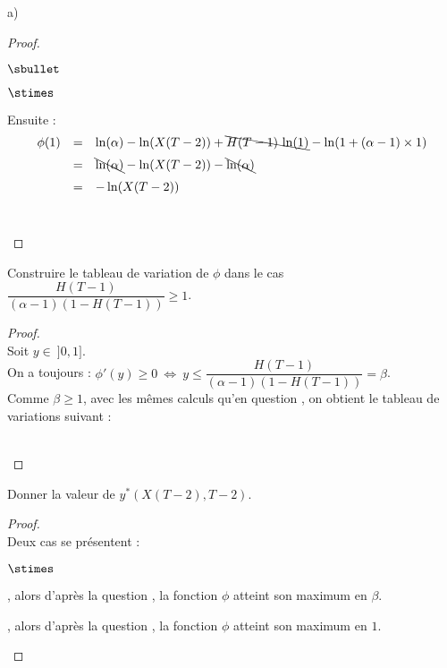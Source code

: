 \documentclass[11pt]{article}%
\begin{document}
\begin{noliste}{a)}
\begin{proof}
\begin{noliste}{$\sbullet$}
\begin{noliste}{$\stimes$}
	  \item Ensuite :
	  \[
	    \begin{array}{rcl}
	      \phi(1) &=& \ln(\alpha) - \ln(X(T-2)) + 
	      \bcancel{H(T-1) \, \ln(1)} - \ln(1+ (\alpha-1) \times 1)
	      \\[.2cm]
	      &=& \bcancel{\ln(\alpha)} - \ln(X(T-2)) - 
	      \bcancel{\ln(\alpha)}
	      \\[.2cm]
	      &=& - \ln(X(T-2))
	    \end{array}
	  \]~\\[-1.8cm]
	\end{noliste}
      \end{noliste}
    \end{proof}
    
    \item Construire le tableau de variation de $\phi$ dans le cas 
    $\dfrac{H(T-1)}{(\alpha-1)(1-H(T-1))} \geq 1$.
    
    \begin{proof}~\\
      Soit $y \in \ ]0,1]$.\\
      On a toujours : $\phi'(y) \geq 0 \ \Leftrightarrow \
      y \leq \dfrac{H(T-1)}{(\alpha -1) (1- H(T-1))} = \beta$.\\[.1cm]
      Comme $\beta \geq 1$, avec les mêmes calculs qu'en 
      question , on obtient le tableau de variations 
      suivant :
      \begin{center}
      \end{center}~\\[-1.4cm]
    \end{proof}

    
    \item Donner la valeur de $y^*(X(T-2),T-2)$.
    
    \begin{proof}~\\
      Deux cas se présentent :
      \begin{noliste}{$\stimes$}
	\item {}, alors d'après la 
	question , la fonction $\phi$ atteint son 
	maximum en $\beta$.
	
	\item {}, alors d'après la 
	question , la fonction $\phi$ atteint son 
	maximum en $1$.
	~\\[-1.2cm]
      \end{noliste}
    \end{proof}
  \end{noliste}
\end{document}
